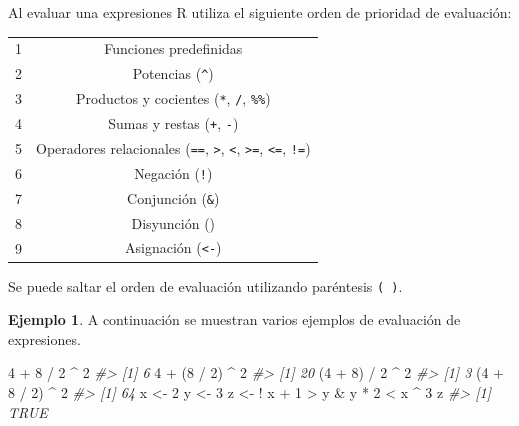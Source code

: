 \documentclass[
]{book}
\newenvironment{Shaded}{\begin{snugshade}}{\end{snugshade}}
\newcommand{\CommentTok}[1]{\textcolor[rgb]{0.56,0.35,0.01}{\textit{#1}}}
\newcommand{\DecValTok}[1]{\textcolor[rgb]{0.00,0.00,0.81}{#1}}
\newcommand{\NormalTok}[1]{#1}
\newcommand{\OtherTok}[1]{\textcolor[rgb]{0.56,0.35,0.01}{#1}}
\newcommand{\SpecialCharTok}[1]{\textcolor[rgb]{0.00,0.00,0.00}{#1}}
\theoremstyle{definition}
\theoremstyle{definition}
\newtheorem{example}{Ejemplo}[chapter]
\theoremstyle{definition}
\theoremstyle{definition}
\theoremstyle{remark}
\begin{document}
Al evaluar una expresiones R utiliza el siguiente orden de prioridad de evaluación:

\begin{longtable}[]{@{}cc@{}}
\toprule
\endhead
1 & Funciones predefinidas \\
2 & Potencias (\texttt{\^{}}) \\
3 & Productos y cocientes (\texttt{*}, \texttt{/}, \texttt{\%\%}) \\
4 & Sumas y restas (\texttt{+}, \texttt{-}) \\
5 & Operadores relacionales (\texttt{==}, \texttt{\textgreater{}}, \texttt{\textless{}}, \texttt{\textgreater{}=}, \texttt{\textless{}=}, \texttt{!=}) \\
6 & Negación (\texttt{!}) \\
7 & Conjunción (\texttt{\&}) \\
8 & Disyunción (\texttt{\textbar{}}) \\
9 & Asignación (\texttt{\textless{}-}) \\
\bottomrule
\end{longtable}

Se puede saltar el orden de evaluación utilizando paréntesis \texttt{(\ )}.

\begin{example}

A continuación se muestran varios ejemplos de evaluación de expresiones.

\begin{Shaded}
\begin{Highlighting}[]
\DecValTok{4} \SpecialCharTok{+} \DecValTok{8} \SpecialCharTok{/} \DecValTok{2} \SpecialCharTok{\^{}} \DecValTok{2}
\CommentTok{\#\textgreater{} [1] 6}
\DecValTok{4} \SpecialCharTok{+}\NormalTok{ (}\DecValTok{8} \SpecialCharTok{/} \DecValTok{2}\NormalTok{) }\SpecialCharTok{\^{}} \DecValTok{2}
\CommentTok{\#\textgreater{} [1] 20}
\NormalTok{(}\DecValTok{4} \SpecialCharTok{+} \DecValTok{8}\NormalTok{) }\SpecialCharTok{/} \DecValTok{2} \SpecialCharTok{\^{}} \DecValTok{2}
\CommentTok{\#\textgreater{} [1] 3}
\NormalTok{(}\DecValTok{4} \SpecialCharTok{+} \DecValTok{8} \SpecialCharTok{/} \DecValTok{2}\NormalTok{) }\SpecialCharTok{\^{}} \DecValTok{2}
\CommentTok{\#\textgreater{} [1] 64}
\NormalTok{x }\OtherTok{\textless{}{-}} \DecValTok{2} 
\NormalTok{y }\OtherTok{\textless{}{-}} \DecValTok{3}
\NormalTok{z }\OtherTok{\textless{}{-}} \SpecialCharTok{!}\NormalTok{ x }\SpecialCharTok{+} \DecValTok{1} \SpecialCharTok{\textgreater{}}\NormalTok{ y }\SpecialCharTok{\&}\NormalTok{ y }\SpecialCharTok{*} \DecValTok{2}  \SpecialCharTok{\textless{}}\NormalTok{ x }\SpecialCharTok{\^{}} \DecValTok{3}
\NormalTok{z}
\CommentTok{\#\textgreater{} [1] TRUE}
\end{Highlighting}
\end{Shaded}

\end{example}
\end{document}
